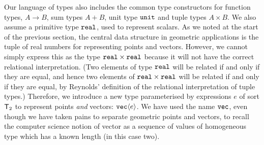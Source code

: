 Our language of types also includes the common type constructors for
function types, $A \to B$, sum types $A + B$, unit type
$\texttt{unit}$ and tuple types $A \times B$. We also assume a
primitive type $\texttt{real}$, used to represent scalars. As we
noted at the start of the previous section, the central data structure
in geometric applications is the tuple of real numbers for
representing points and vectors. However, we cannot simply express
this as the type $\texttt{real} \times \texttt{real}$ because it
will not have the correct relational interpretation. (Two elements of
type $\texttt{real}$ will be related if and only if they are equal,
and hence two elements of $\texttt{real} \times \texttt{real}$
will be related if and only if they are equal, by Reynolds' definition
of the relational interpretation of tuple types.) Therefore, we
introduce a new type parameterised by expressions $e$ of sort
$\mathsf{T}_2$ to represent points \emph{and} vectors:
$\texttt{vec}\langle e \rangle$. We have used the name $\texttt{vec}$, even though
we have taken pains to separate geometric points and vectors, to
recall the computer science notion of vector as a sequence of values
of homogeneous type which has a known length (in this case two).

